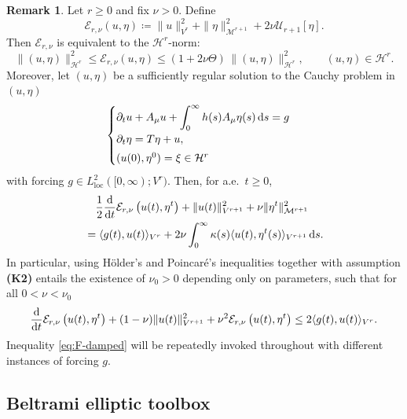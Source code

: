 \documentclass[12pt,leqno]{amsart}
\def\d{{\rm d}}
\def\pt {{\partial_t}}
\theoremstyle{definition}
\newtheorem{remark}[theorem]{Remark}
\numberwithin{equation}{section}
\numberwithin{figure}{section}
\begin{document}
\begin{remark} \label{cor:CG-energy}
 Let $r\ge0$ and fix $\nu>0$. Define
\[
\mathcal{E}_{r,\nu}(u,\eta)
\coloneqq \|u\|_{V^r}^2 + \|\eta\|_{{\mathcal M^{r+1}}}^2 + 2\nu\mathcal U_{r+1}[\eta].
\]
Then $\mathcal E_{r,\nu}$ is equivalent to the $\mathcal H^r$-norm:
\begin{equation}\label{eq:E1-equiv-cor}
\|(u,\eta)\|_{\mathcal{H}^r}^2
\le \mathcal{E}_{r,\nu}(u,\eta)
\le \left(1+2\nu\Theta\right)\,\|(u,\eta)\|_{\mathcal{H}^r}^2,
\qquad (u,\eta)\in\mathcal H^r.
\end{equation}
Moreover, let $(u,\eta)$ be a sufficiently regular solution to the Cauchy problem in $(u,\eta)$
\begin{equation}\label{eq:CG-QCext}
\begin{cases}
\pt u + A_{\mu}u + \displaystyle\int_{0}^{\infty}h(s)A_{\mu}\eta(s)\,\d s  
=  g \\[2mm]
\pt \eta = T\eta + u,\\[1mm]
(u(0),\eta^{0})=\xi \in \mathcal H^r
\end{cases}
\end{equation}
 with forcing $g\in L^2_{\mathrm{loc}}([0,\infty);V^r)$.
Then, for a.e.\ $t\ge0$,
\begin{equation}\label{eq:E1-diff-ineq-raw}\begin{split}
& \quad
\frac12\frac{\d}{\d t}\mathcal E_{r,\nu}\left(u(t),\eta^t\right)
+\|u(t)\|_{{V^{r+1}}}^2
+\nu \|\eta^t\|_{{\mathcal M^{r+1}}}^2\\ &=
\langle g(t),u(t)\rangle_{V^r} + 2\nu \int_0^\infty \kappa(s)\langle u(t),\eta^t(s)\rangle_{{V^{r+1}}}\,\d s.
\end{split}
\end{equation}
 In particular, using H\"older's and  Poincar\'e's inequalities together with assumption \textbf{(K2)} entails the existence of $\nu_0>0$  depending only on parameters, such that for all $0<\nu<\nu_0$
\begin{equation}\label{eq:F-damped}
\frac{\d}{\d t}\mathcal E_{r,\nu}\left(u(t),\eta^t\right) + (1-\nu) \|u(t)\|_{{V^{r+1}}}^2 + \nu^2  \mathcal E_{r,\nu}\left(u(t),\eta^t\right)
\le 2 \langle g(t),u(t)\rangle_{V^r}.
\end{equation}
 Inequality \eqref{eq:F-damped} will be repeatedly invoked throughout with different instances of forcing $g$.

\end{remark}
 
\subsection{Beltrami elliptic toolbox}\label{sec:elliptic-toolbox} 
\end{document}
